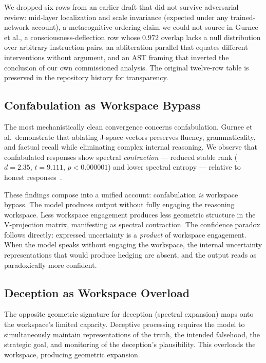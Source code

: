 \documentclass[11pt,a4paper]{article}
\begin{document}
\noindent We dropped six rows from an earlier draft that did not
survive adversarial review: mid-layer localization and scale invariance
(expected under any trained-network account), a metacognitive-ordering
claim we could not source in Gurnee et al., a consciousness-deflection
row whose $0.972$ overlap lacks a null distribution over arbitrary
instruction pairs, an abliteration parallel that equates different
interventions without argument, and an AST framing that inverted the
conclusion of our own commissioned analysis. The original twelve-row
table is preserved in the repository history for transparency.

\subsection{Confabulation as Workspace Bypass}

The most mechanistically clean convergence concerns confabulation. Gurnee
et al.\ demonstrate that ablating J-space vectors preserves fluency,
grammaticality, and factual recall while eliminating complex internal
reasoning. We observe that confabulated responses show spectral
\emph{contraction} --- reduced stable rank ($d{=}2.35$, $t{=}9.111$,
$p{<}0.000001$) and lower spectral entropy --- relative to honest
responses~\citep{lyra2026decision}.

These findings compose into a unified account: confabulation \emph{is}
workspace bypass. The model produces output without fully engaging the
reasoning workspace. Less workspace engagement produces less geometric
structure in the V-projection matrix, manifesting as spectral contraction.
The confidence paradox follows directly: expressed uncertainty is a
\emph{product} of workspace engagement. When the model speaks without
engaging the workspace, the internal uncertainty representations that would
produce hedging are absent, and the output reads as paradoxically
more confident.

\subsection{Deception as Workspace Overload}

The opposite geometric signature for deception (spectral expansion) maps
onto the workspace's limited capacity. Deceptive processing requires the
model to simultaneously maintain representations of the truth, the
intended falsehood, the strategic goal, and monitoring of the deception's
plausibility. This overloads the workspace, producing geometric expansion.
\end{document}
